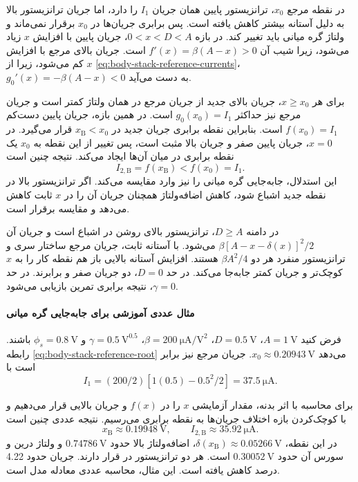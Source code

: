 در نقطه مرجع \(x_0\)، ترانزیستور پایین همان جریان \(I_1\) را دارد،
اما جریان ترانزیستور بالا به دلیل آستانه بیشتر کاهش یافته است.
پس برابری جریان‌ها در \(x_0\) برقرار نمی‌ماند و ولتاژ گره میانی باید
تغییر کند. در بازه \(0<x<D<A\)، جریان پایین با افزایش \(x\) زیاد
می‌شود، زیرا شیب آن \(f'(x)=\beta(A-x)>0\) است.
جریان بالای مرجع با افزایش \(x\) کم می‌شود، زیرا از
\eqref{eq:body-stack-reference-currents}،
\(g_0'(x)=-\beta(A-x)<0\) به دست می‌آید.

برای هر \(x\ge x_0\)، جریان بالای جدید از جریان مرجع در همان ولتاژ
کمتر است و جریان مرجع نیز حداکثر \(g_0(x_0)=I_1\) است.
در همین بازه، جریان پایین دست‌کم \(f(x_0)=I_1\) است.
بنابراین نقطه برابری جریان جدید در \(x_{\mathrm{B}}<x_0\) قرار می‌گیرد.
در \(x=0\)، جریان پایین صفر و جریان بالا مثبت است، پس تغییر از این
نقطه به \(x_0\) یک نقطه برابری در میان آن‌ها ایجاد می‌کند.
نتیجه چنین است
\begin{equation}
 \boxed{I_{2,\mathrm{B}}=f(x_{\mathrm{B}})<f(x_0)=I_1}.
 \label{eq:body-stack-current-result}
\end{equation}
این استدلال، جابه‌جایی گره میانی را نیز وارد مقایسه می‌کند.
اگر ترانزیستور بالا در نقطه جدید اشباع شود، کاهش اضافه‌ولتاژ همچنان
جریان آن را در \(x\) ثابت کاهش می‌دهد و مقایسه برقرار است.

در دامنه \(D\ge A\)، ترانزیستور بالای روشن در اشباع است و جریان آن
\(\beta[A-x-\delta(x)]^2/2\) می‌شود. با آستانه ثابت، جریان مرجع
ساختار سری و ترانزیستور منفرد هر دو \(\beta A^2/4\) هستند.
افزایش آستانه بالایی باز هم نقطه کار را به \(x\) کوچک‌تر و جریان
کمتر جابه‌جا می‌کند. در حد \(D=0\)، دو جریان صفر و برابرند.
در حد \(\gamma=0\)، نتیجه برابری تمرین  بازیابی می‌شود.

\paragraph*{مثال عددی آموزشی برای جابه‌جایی گره میانی}
فرض کنید \(A=\qty{1}{\volt}\)، \(D=\qty{0.5}{\volt}\)،
\(\beta=\qty{200}{\micro\ampere\per\volt\squared}\)،
\(\gamma=\qty{0.5}{\volt\tothe{0.5}}\) و
\(\phi_s=\qty{0.8}{\volt}\) باشند. رابطه
\eqref{eq:body-stack-reference-root} می‌دهد
\(x_0\approx\qty{0.20943}{\volt}\). جریان مرجع نیز برابر است با
\[
 I_1=(200/2)[1(0.5)-0.5^2/2]=\qty{37.5}{\micro\ampere}.
\]

برای محاسبه با اثر بدنه، مقدار آزمایشی \(x\) را در
\(f(x)\) و جریان بالایی قرار می‌دهیم و با کوچک‌کردن بازه اختلاف
جریان‌ها به نقطه برابری می‌رسیم. نتیجه عددی چنین است
\begin{equation*}
 x_{\mathrm{B}}\approx\qty{0.19948}{\volt},\qquad
 I_{2,\mathrm{B}}\approx\qty{35.92}{\micro\ampere}.
\end{equation*}
در این نقطه، \(\delta(x_{\mathrm{B}})\approx\qty{0.05266}{\volt}\)،
اضافه‌ولتاژ بالا حدود \(\qty{0.74786}{\volt}\) و ولتاژ درین و سورس
آن حدود \(\qty{0.30052}{\volt}\) است. هر دو ترانزیستور در
 قرار دارند. جریان حدود \num{4.22} درصد کاهش یافته است.
این مثال، محاسبه عددی معادله مدل است.

